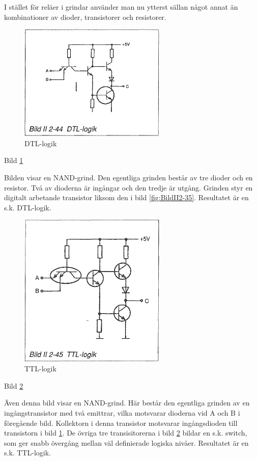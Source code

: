 I stället för reläer i grindar använder man nu ytterst sällan något annat än
kombinationer av dioder, transistorer och resistorer.

\begin{figure}[h]
\begin{center}
\includegraphics[width=7cm]{images/bild_2_2-44}
\caption{DTL-logik}
\label{fig:BildII2-44}
\end{center}
\end{figure}

Bild \ref{fig:BildII2-44}

Bilden visar en NAND-grind. Den egentliga grinden består av tre dioder och en
resistor. Två av dioderna är ingångar och den tredje är utgång. Grinden styr en
digitalt arbetande transistor liksom den i bild \ref{fig:BildII2-35}.
Resultatet är en s.k. DTL-logik.

\begin{figure}[h]
\begin{center}
\includegraphics[width=7cm]{images/bild_2_2-45}
\caption{TTL-logik}
\label{fig:BildII2-45}
\end{center}
\end{figure}

Bild \ref{fig:BildII2-45}

Även denna bild visar en NAND-grind. Här består den egentliga grinden av en
ingångstransistor med två emittrar, vilka motsvarar dioderna vid A och B i
föregående bild. Kollektorn i denna transistor motsvarar ingångsdioden till
transistorn i bild \ref{fig:BildII2-44}. De övriga tre transisitorerna i bild
\ref{fig:BildII2-45} bildar en s.k. switch, som ger snabb övergång mellan väl
definierade logiska nivåer. Resultatet är en s.k. TTL-logik.
